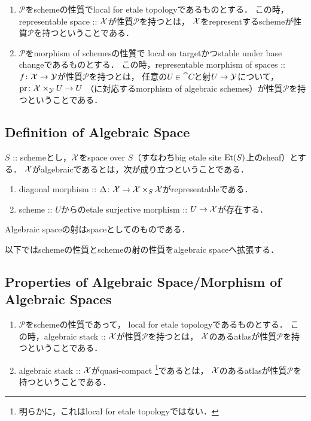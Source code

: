 \documentclass[a4paper, dvipdfmx]{jsarticle}
\newcommand{\Diag}{\Delta}
\begin{document}
    \begin{Def}
        \enumfix
    \begin{enumerate}
    \item
        $\mathcal{P}$をschemeの性質でlocal for etale topologyであるものとする．
        この時，representable space :: $\mathcal{X}$が性質$\mathcal{P}$を持つとは，
        $\mathcal{X}$をrepresentするschemeが性質$\mathcal{P}$を持つということである．

    \item
        $\mathcal{P}$をmorphism of schemesの性質で
        local on targetかつstable under base changeであるものとする．
        この時，representable morphism of spaces :: $f \colon \mathcal{X} \to \mathcal{Y}$が性質$\mathcal{P}$を持つとは，
        任意の$U \in \cat{C}$と射$U \to \mathcal{Y}$について，
        $\operatorname{pr} \colon \mathcal{X} \times_{\mathcal{Y}} U \to U$
        （に対応するmorphism of algebraic schemes）が性質$\mathcal{P}$を持つということである．
    \end{enumerate}
    \end{Def}

\subsection{Definition of Algebraic Space}
    \begin{Def}
        $S$ :: schemeとし，$\mathcal{X}$をspace over $S$（すなわちbig etale site $\mathrm{Et}(S)$上のsheaf）とする．
        $\mathcal{X}$がalgebraicであるとは，次が成り立つということである．
    \begin{enumerate}
        \item diagonal morphism :: $\Diag \colon \shX \to \shX \times_{S} \shX$がrepresentableである．
        \item scheme :: $U$からのetale surjective morphism :: $U \to \mathcal{X}$が存在する．
    \end{enumerate}
        Algebraic spaceの射はspaceとしてのものである．
    \end{Def}
    
以下ではschemeの性質とschemeの射の性質をalgebraic spaceへ拡張する．

\subsection{Properties of Algebraic Space/Morphism of Algebraic Spaces}
    \begin{Def}
        \enumfix
    \begin{enumerate}
    \item
        $\mathcal{P}$をschemeの性質であって，
        local for etale topologyであるものとする．
        この時，algebraic stack :: $\mathcal{X}$が性質$\mathcal{P}$を持つとは，
        $\mathcal{X}$のあるatlasが性質$\mathcal{P}$を持つということである．

    \item
        algebraic stack :: $\mathcal{X}$がquasi-compact
        \footnote{ 明らかに，これはlocal for etale topologyではない． }であるとは，
        $\mathcal{X}$のあるatlasが性質$\mathcal{P}$を持つということである．
    \end{enumerate}
    \end{Def}
\end{document}
